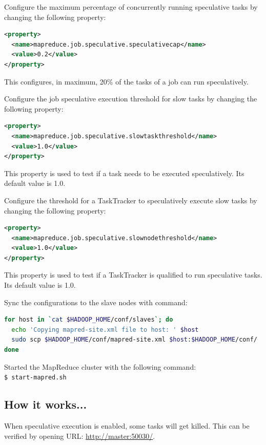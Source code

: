 Configure the maximum percentage of concurrently running speculative tasks by changing the following property:
\lstset{style=bashstyle}
\begin{lstlisting}[language=XML]
<property>
  <name>mapreduce.job.speculative.speculativecap</name>
  <value>0.2</value>
</property>
\end{lstlisting}
This configures, in maximum, 20\% of the tasks of a job can run speculatively.


Configure the job speculative execution threshold for slow tasks by changing the following property:
\lstset{style=bashstyle}
\begin{lstlisting}[language=XML]
<property>
  <name>mapreduce.job.speculative.slowtaskthreshold</name>
  <value>1.0</value>
</property>
\end{lstlisting}

This property is used to test if a task needs to be executed speculatively. Its default value is 1.0.


Configure the threshold for a TaskTracker to speculatively execute slow tasks by changing the following property:
\lstset{style=bashstyle}
\begin{lstlisting}[language=XML]
<property>
  <name>mapreduce.job.speculative.slownodethreshold</name>
  <value>1.0</value>
</property>
\end{lstlisting}
This property is used to test if a TaskTracker is qualified to run speculative tasks. Its default value is 1.0.


Sync the configurations to the slave nodes with command:
\lstset{style=bashstyle}
\begin{lstlisting}[language=bash]
for host in `cat $HADOOP_HOME/conf/slaves`; do
  echo 'Copying mapred-site.xml file to host: ' $host
  sudo scp $HADOOP_HOME/conf/mapred-site.xml $host:$HADOOP_HOME/conf/
done
\end{lstlisting}

Started the MapReduce cluster with the following command:\\
\verb|$ start-mapred.sh|

\subsection*{How it works...}
When speculative execution is enabled, some tasks will get killed. This can be verified by opening URL: \url{http://master:50030/}.

